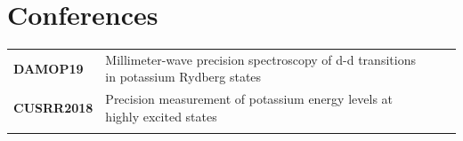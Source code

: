 \documentclass[a4paper, 10.5pt]{article}
\begin{document}
	\section*{\normalsize{{\color{colby}Conferences}}}
		\begin{tabular}{lp{13.5cm}lp{8in}}
			\textbf{DAMOP19} & Millimeter-wave precision spectroscopy of d-d transitions in potassium Rydberg states \\
			\textbf{CUSRR2018} & Precision measurement of potassium energy levels at highly excited states\\\\
		\end{tabular}
	
\end{document}
